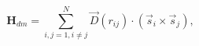 \documentclass[preview]{standalone}
\begin{document}
\begin{varwidth}{50in}
  \begin{equation}
    \bm{H}_{dm} = \sum_{{ i,j}=1,i\neq j}^{N} \vec{D}\left(r_{ij}\right) \cdot\left(\vec{s}_{i}\times \vec{s}_{j}\right), \nonumber
  \end{equation}
\end{varwidth}
\end{document}
